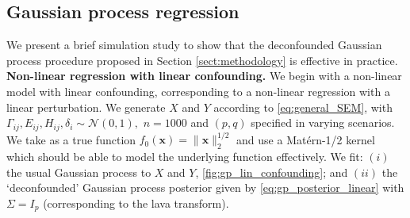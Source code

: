 \documentclass[11pt]{article}
\newcommand{\subparspace}{\vspace{3mm} \\}
\newcommand{\bx}{\mathbf{x}}
\begin{document}
\subsection{Gaussian process regression}

We present a brief simulation study to show that the deconfounded Gaussian process procedure proposed in Section \ref{sect:methodology} is effective in practice.
\subparspace
{\bf Non-linear regression with linear confounding. } We begin with a non-linear model with linear confounding, corresponding to a non-linear regression with a linear perturbation. We generate $X$ and $Y$ according to \eqref{eq:general_SEM}, with $\Gamma_{ij}, E_{ij}, H_{ij}, \delta_{i} \sim \mathcal{N}(0, 1),$ $n = 1000$ and $(p, q)$ specified in varying scenarios. We take as a true function $f_0(\bx) = \|\bx\|_2^{1/2}$ and use a Mat\'ern-1/2 kernel which should be able to model the underlying function effectively. We fit: $(i)$ the usual Gaussian process to $X$ and $Y$, \ref{fig:gp_lin_confounding}; and $(ii)$ the `deconfounded' Gaussian process posterior given by \eqref{eq:gp_posterior_linear} with $\Sigma = I_p$ (corresponding to the lava transform).

\end{document}
